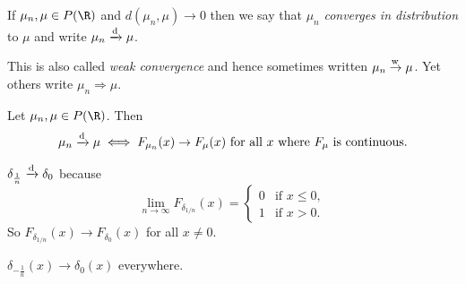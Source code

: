 
\begin{definition}
    If $\mu_n, \mu \in P(\R)$ and $d(\mu_n, \mu) \to 0$ then we say that
    $\mu_n$ \emph{converges in distribution} to $\mu$ and write
    $\mu_n \xrightarrow{\text{d}} \mu$.
\end{definition}
\begin{remark}
    This is also called \emph{weak convergence} and hence sometimes written
    $\mu_n \overset{\text{w\,}}{\rightarrow} \mu$.
    Yet others write $\mu_n \Rightarrow \mu$.
\end{remark}

\begin{proposition}
    Let $\mu_n, \mu \in P(\R)$.
    Then \[
        \mu_n \xrightarrow{\text{d}} \mu \iff F_{\mu_n}(x) \to F_\mu(x) \text{ for all } x
        \text{ where } F_\mu \text{ is continuous.}
    \]
\end{proposition}
\begin{examples}
    \item $\delta_{\frac1n} \xrightarrow{\text{d}} \delta_0$ because \[
        \lim_{n \to \infty} F_{\delta_{1/n}}(x) = \begin{cases}
            0 & \text{if } x \le 0, \\
            1 & \text{if } x > 0.
        \end{cases}
    \] So $F_{\delta_{1/n}}(x) \to F_{\delta_0}(x)$ for all $x \ne 0$.
    \item $\delta_{-\frac1n}(x) \to \delta_0(x)$ everywhere.
\end{examples}

